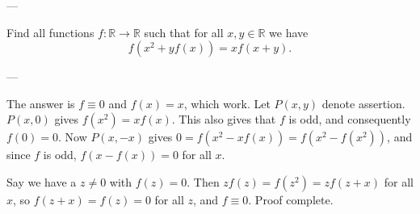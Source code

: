 
---

Find all functions $f:\mathbb R\to\mathbb R$ such that for all $x,y\in\mathbb R$ we have \[f(x^2+yf(x))=xf(x+y).\]

---

The answer is $f\equiv0$ and $f(x)=x$, which work. Let $P(x,y)$ denote assertion. $P(x,0)$ gives $f(x^2)=xf(x)$. This also gives that $f$ is odd, and consequently $f(0)=0$. Now $P(x,-x)$ gives $0=f\left(x^2-xf(x)\right)=f\left(x^2-f(x^2)\right)$, and since $f$ is odd, $f(x-f(x))=0$ for all $x$.

Say we have a $z\ne0$ with $f(z)=0$. Then $zf(z)=f(z^2)=zf(z+x)$ for all $x$, so $f(z+x)=f(z)=0$ for all $z$, and $f\equiv0$. Proof complete.
